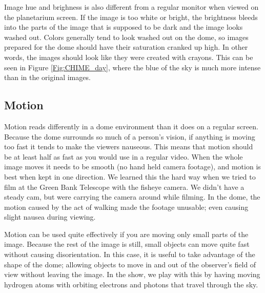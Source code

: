 Image hue and brighness is also different from a regular monitor when viewed on the planetarium screen. If the image is too white or bright, the brightness bleeds into the parts of the image that is supposed to be dark and the image looks washed out. Colors generally tend to look washed out on the dome, so images prepared for the dome should have their saturation cranked up high. In other words, the images should look like they were created with crayons. This can be seen in Figure \ref{Fig:CHIME_day}, where the blue of the sky is much more intense than in the original images. 

\subsection{Motion}
Motion reads differently in a dome environment than it does on a regular screen. Because the dome surrounds so much of a person's vision, if anything is moving too fast it tends to make the viewers nauseous. This means that motion should be at least half as fast as you would use in a regular video. When the whole image moves it needs to be smooth (no hand held camera footage), and motion is best when kept in one direction. We learned this the hard way when we tried to film at the Green Bank Telescope with the fisheye camera. We didn't have a steady cam, but were carrying the camera around while filming. In the dome, the motion caused by the act of walking made the footage unusable; even causing slight nausea during viewing.

Motion can be used quite effectively if you are moving only small parts of the image. Because the rest of the image is still, small objects can move quite fast without causing disorientation. In this case, it is useful to take advantage of the shape of the dome; allowing objects to move in and out of the observer's field of view without leaving the image. In the show, we play with this by having moving hydrogen atoms with orbiting electrons and photons that travel through the sky. 

